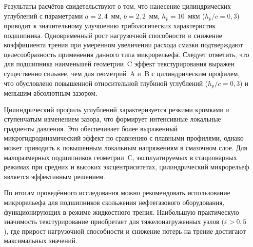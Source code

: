 Результаты расчётов свидетельствуют о том, что нанесение цилиндрических углублений с параметрами $a = 2{,}4$~мм, $b = 2{,}2$~мм, $h_p = 10$~мкм ($h_p/c = 0{,}3$) приводит к значительному улучшению трибологических характеристик подшипника. Одновременный рост нагрузочной способности и снижение коэффициента трения при умеренном увеличении расхода смазки подтверждают целесообразность применения данного типа микрорельефа. Следует отметить, что для подшипника наименьшей геометрии~C эффект текстурирования выражен существенно сильнее, чем для геометрий~A и~B с цилиндрическим профилем, что обусловлено повышенной относительной глубиной углублений ($h_p/c = 0{,}3$) и меньшим абсолютным зазором.

Цилиндрический профиль углублений характеризуется резкими кромками и ступенчатым изменением зазора, что формирует интенсивные локальные градиенты давления. Это обеспечивает более выраженный микрогидродинамический эффект по сравнению с плавными профилями, однако может приводить к повышенным локальным напряжениям в смазочном слое. Для малоразмерных подшипников геометрии~C, эксплуатируемых в стационарных режимах при средних и высоких эксцентриситетах, цилиндрический микрорельеф является эффективным решением.

По итогам проведённого исследования можно рекомендовать использование \varDimpleTypeGenitive{} микрорельефа для подшипников скольжения нефтегазового оборудования, функционирующих в режиме жидкостного трения. Наибольшую практическую значимость текстурирование приобретает для тяжелонагруженных узлов ($\varepsilon > 0{,}5$), где прирост нагрузочной способности и снижение потерь на трение достигают максимальных значений.
